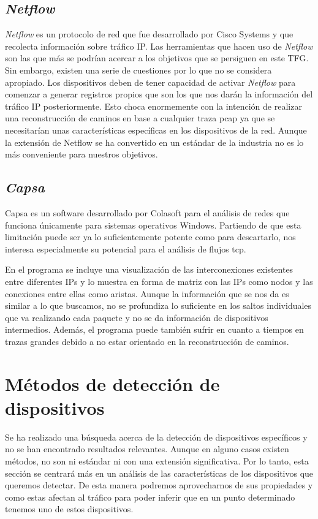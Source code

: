 \documentclass[tfg,epsbased,lof,lot,loa,covers,final,copyright,overleaf]{tfgtfmthesisuam}
\begin{document}
\subsection{\textit{Netflow}}
\textit{Netflow} \cite{NetFlow} es un protocolo de red que fue desarrollado por Cisco Systems y que recolecta información sobre tráfico IP. Las herramientas que hacen uso de \textit{Netflow} son las que más se podrían acercar a los objetivos que se persiguen en este TFG. Sin embargo, existen una serie de cuestiones por lo que no se considera apropiado. Los dispositivos deben de tener capacidad de activar \textit{Netflow} para comenzar a generar registros propios que son los que nos darán la información del tráfico IP posteriormente. Esto choca enormemente con la intención de realizar una reconstrucción de caminos en base a cualquier traza pcap ya que se necesitarían unas características específicas en los dispositivos de la red. Aunque la extensión de Netflow se ha convertido en un estándar de la industria no es lo más conveniente para nuestros objetivos.

\subsection{\textit{Capsa}} 
Capsa \cite{ColasoftCapsa} es un software desarrollado por Colasoft para el análisis de redes que funciona únicamente para sistemas operativos Windows. Partiendo de que esta limitación puede ser ya lo suficientemente potente como para descartarlo, nos interesa especialmente su potencial para el análisis de flujos \gls{tcp}.

En el programa se incluye una visualización de las interconexiones existentes entre diferentes IPs y lo muestra en forma de matriz con las IPs como nodos y las conexiones entre ellas como aristas. Aunque la información que se nos da es similar a lo que buscamos, no se profundiza lo suficiente en los saltos individuales que va realizando cada paquete y no se da información de dispositivos intermedios. Además, el programa puede también sufrir en cuanto a tiempos en trazas grandes debido a no estar orientado en la reconstrucción de caminos.

\section{Métodos de detección de dispositivos}
Se ha realizado una búsqueda acerca de la detección de dispositivos específicos y no se han encontrado resultados relevantes. Aunque en alguno casos existen métodos, no son ni estándar ni con una extensión significativa. Por lo tanto, esta sección se centrará más en un análisis de las características de los dispositivos que queremos detectar. De esta manera podremos aprovecharnos de sus propiedades y como estas afectan al tráfico para poder inferir que en un punto determinado tenemos uno de estos dispositivos.
\end{document}
